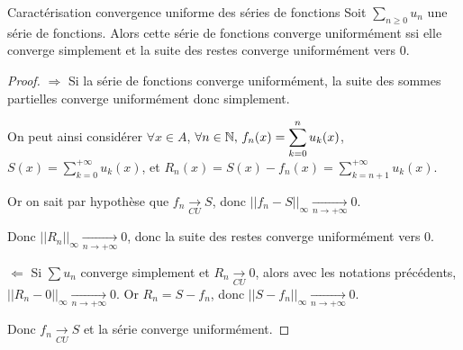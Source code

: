 \begin{propositionnt}{Caractérisation convergence uniforme des séries de fonctions}
    Soit $\displaystyle \sum_{n \geqslant 0} u_n$ une série de fonctions. Alors 
    cette série de fonctions converge uniformément ssi elle converge simplement et
    la suite des restes converge uniformément vers $0$. 
\end{propositionnt}


\begin{proof}
    $\Rightarrow$ Si la série de fonctions converge uniformément, la suite des sommes partielles converge 
    uniformément donc simplement. 

    On peut ainsi considérer $\forall x \in A$, $\forall n \in \mathbb{N}, \, f_n(x) = \displaystyle \sum_{k = 0}^n u_k(x)$, 
    $\displaystyle S(x) = \sum_{k = 0}^{ + \infty } u_k(x)$, et $\displaystyle R_n(x) = S(x) - f_n(x) = \sum_{k = n + 1}^{ + \infty } u_k(x)$.

    Or on sait par hypothèse que $f_n \xrightarrow[CU]{} S$, donc $||f_n - S||_{\infty} \xrightarrow[n\to +\infty]{} 0$.

    Donc $\displaystyle || R_n ||_{\infty} \xrightarrow[n\to +\infty]{} 0$, donc la suite des restes converge uniformément vers $0$.


    \lvspace   $\Leftarrow$ Si $\displaystyle \sum u_n$ converge simplement et $R_n \xrightarrow[CU]{} 0$, alors avec les notations
    précédents, $||R_n - 0 ||_{\infty} \xrightarrow[n\to +\infty]{} 0$. Or $R_n = S - f_n$, donc $|| S - f_n ||_{\infty} \xrightarrow[n\to +\infty]{} 0$.

    Donc $f_n \xrightarrow[CU]{} S$ et la série converge uniformément.
\end{proof}

